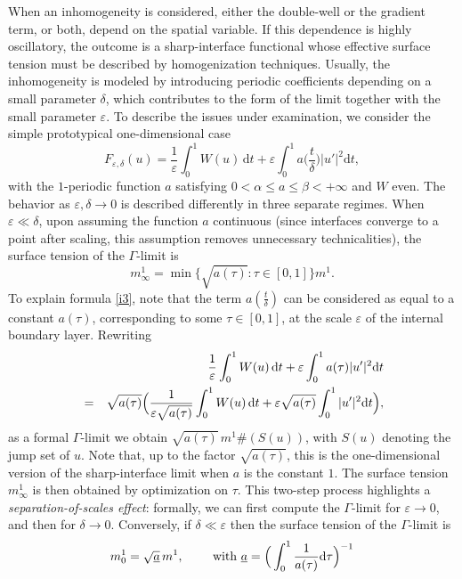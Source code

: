 \documentclass{article}
\theoremstyle{definition}
\newcommand{\de}{\mathrm{d}}
\newcommand{\e}{\varepsilon}
\def\e{\varepsilon}
\begin{document}
When an inhomogeneity is considered, either the double-well or the gradient term, or both, depend on the spatial variable. If this dependence is highly oscillatory, the outcome is a sharp-interface functional whose effective surface tension must be described by homogenization techniques.
Usually, the inhomogeneity is modeled by introducing periodic coefficients depending on a small parameter $\delta$, which contributes to the form of the limit together with the small parameter $\e$. To describe the issues under examination, we consider the simple prototypical one-dimensional case 
\begin{equation}\label{i2}
F_{\e,\delta}(u)= \frac1\e\int_0^1 W(u)\,\de t+\e\int_0^1a\Big(\frac{t}\delta\Big)|u'|^2\de t,
\end{equation}
with the $1$-periodic function $a$ satisfying $0<\alpha\leq a\leq \beta<+\infty$ and $W$ even. 
The behavior as $\e,\delta\to 0$ is described differently in three separate regimes.  
When $\e\ll\delta$, upon assuming the function $a$ continuous (since interfaces converge to a point after scaling, this assumption removes unnecessary technicalities), the surface tension of the $\Gamma$-limit is
\begin{equation}\label{i3}
m^1_\infty= \min\big\{\sqrt{ a(\tau)}:\tau\in[0,1]\big\} m^1.
\end{equation}
 To explain formula \eqref{i3}, note that the term $a(\frac{t}\delta)$ can be considered as equal to a constant $a(\tau)$, corresponding to some $\tau\in[0,1]$, at the scale $\e$ of the internal boundary layer. Rewriting 
\begin{eqnarray}\label{i4}\nonumber
&&\hskip-1cm\frac1\e\int_0^1 W(u)\,\de t+\e\int_0^1a(\tau)|u'|^2\de t\\
&=&\sqrt{a(\tau)}\Big(
\frac{1}{\e\sqrt {a(\tau)}}\int_0^1 W(u)\,\de t+\e\sqrt{ a(\tau)}\int_0^1|u'|^2\de t\Big),
\end{eqnarray}
as a formal $\Gamma$-limit we obtain  $\sqrt{ a(\tau)}\, m^1\#(S(u))$, with $S(u)$ denoting the jump set of $u$. Note that, up to the factor $\sqrt{a(\tau)}$, this is the one-dimensional version of the sharp-interface limit when $a$ is the constant $1$. 
The surface tension $m^1_\infty$ is then obtained by optimization on $\tau$. This two-step process highlights a {\em separation-of-scales effect}: formally, we can first compute the $\Gamma$-limit for $\e\to 0$, and then for $\delta\to 0$. Conversely, if $\delta\ll\e$ then the surface tension of the $\Gamma$-limit is
\begin{equation}\label{i5}
m^1_0= \sqrt{\underline a} \,m^1, \qquad \hbox{ with } \underline a= \Big(\int_0^1\frac{1}{a(\tau)}\de\tau\Big)^{-1}
\end{equation}
\end{document}
